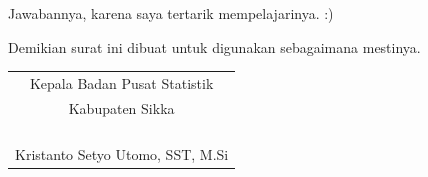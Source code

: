 \documentclass{article}
\begin{document}
Jawabannya, karena saya tertarik mempelajarinya. :)

Demikian surat ini dibuat untuk digunakan sebagaimana mestinya.

\bigskip %

\bigskip
\hfill
\begin{tabular}{@{}c}
	Kepala Badan Pusat Statistik\\
    Kabupaten Sikka \bigskip\\
    \\
    \\
    \\
    \\
	Kristanto Setyo Utomo, SST, M.Si
\end{tabular}
\end{document}
